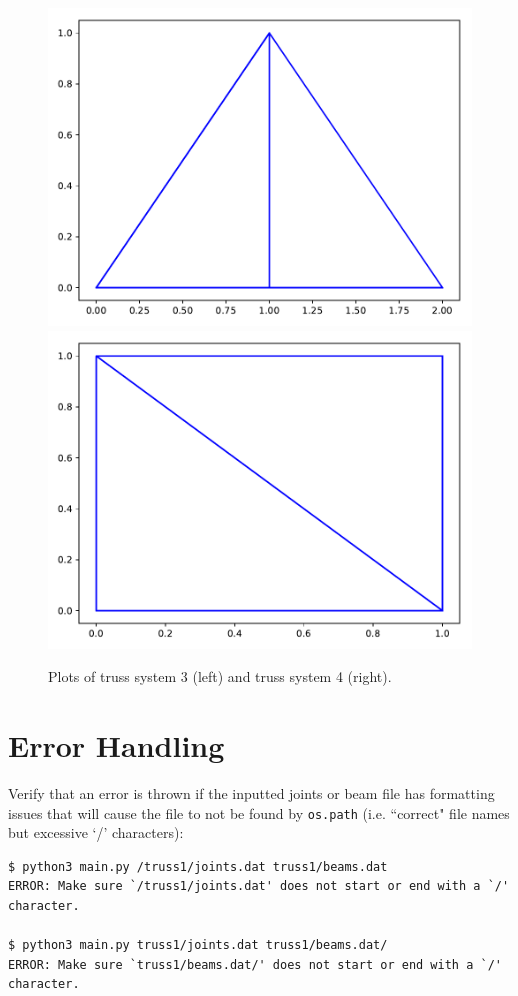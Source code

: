 \documentclass[11pt]{amsart}
\theoremstyle{definition}
\begin{document}
\begin{figure}[h]
\centerline{\includegraphics[scale=.4]{Figure3.pdf} \includegraphics[scale=.4]{Figure4.pdf}}
\caption{Plots of truss system 3 (left) and truss system 4 (right).}
\end{figure}


\section{Error Handling}
Verify that an error is thrown if the inputted joints or beam file has formatting issues that will cause the file to not be found by \texttt{os.path} (i.e. ``correct" file names but excessive `/' characters):
\begin{Verbatim}[fontsize=\small]
$ python3 main.py /truss1/joints.dat truss1/beams.dat
ERROR: Make sure `/truss1/joints.dat' does not start or end with a `/' character.

$ python3 main.py truss1/joints.dat truss1/beams.dat/
ERROR: Make sure `truss1/beams.dat/' does not start or end with a `/' character.
\end{Verbatim}
\end{document}
